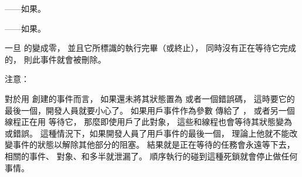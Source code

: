\item {}——如果\scdevfailres。

\item {}——如果\schostfailres。
\stopigBase

一旦  的變成零，
並且它所標識的執行完畢（或終止），
同時沒有正在等待它完成的，
則此事件就會被刪除。

注意：

對於用  創建的事件而言，
如果還未將其狀態置為  或者一個錯誤碼，
這時要它的最後一個，開發人員就要小心了。
如果用戶事件作為參數  傳給了 ，
或者另一個線程正在用  等待它，
那麼即使用戶了此對象，
這些和線程也會等待其狀態變為  或錯誤。
這種情況下，如果開發人員了用戶事件的最後一個，
理論上他就不能改變事件的狀態以解除其他部分的阻塞。
結果就是正在等待的任務會永遠等下去，
相關的事件、  對象、和多半就泄漏了。
順序執行的碰到這種死鎖就會停止做任何事情。

